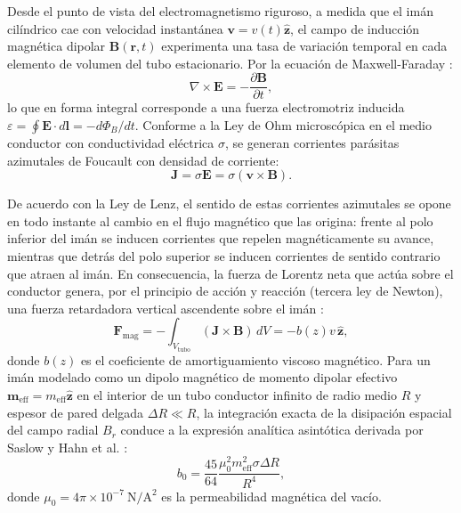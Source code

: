 \documentclass[aps,prb,reprint,twocolumn,superscriptaddress,amsmath,amssymb,floatfix]{revtex4-2}
\begin{document}
Desde el punto de vista del electromagnetismo riguroso, a medida que el imán cilíndrico cae con velocidad instantánea $\mathbf{v} = v(t)\hat{\mathbf{z}}$, el campo de inducción magnética dipolar $\mathbf{B}(\mathbf{r}, t)$ experimenta una tasa de variación temporal en cada elemento de volumen del tubo estacionario. Por la ecuación de Maxwell-Faraday \cite{Griffiths2017}:
\begin{equation}
\nabla \times \mathbf{E} = -\frac{\partial \mathbf{B}}{\partial t},
\label{eq:faraday}
\end{equation}
lo que en forma integral corresponde a una fuerza electromotriz inducida $\varepsilon = \oint \mathbf{E} \cdot d\mathbf{l} = -d\Phi_B / dt$. Conforme a la Ley de Ohm microscópica en el medio conductor con conductividad eléctrica $\sigma$, se generan corrientes parásitas azimutales de Foucault con densidad de corriente:
\begin{equation}
\mathbf{J} = \sigma \mathbf{E} = \sigma (\mathbf{v} \times \mathbf{B}).
\label{eq:ohm}
\end{equation}

De acuerdo con la Ley de Lenz, el sentido de estas corrientes azimutales se opone en todo instante al cambio en el flujo magnético que las origina: frente al polo inferior del imán se inducen corrientes que repelen magnéticamente su avance, mientras que detrás del polo superior se inducen corrientes de sentido contrario que atraen al imán. En consecuencia, la fuerza de Lorentz neta que actúa sobre el conductor genera, por el principio de acción y reacción (tercera ley de Newton), una fuerza retardadora vertical ascendente sobre el imán \cite{Hahn2002,MacLatchy1993}:
\begin{equation}
\mathbf{F}_{\mathrm{mag}} = -\int_{V_{\mathrm{tubo}}} (\mathbf{J} \times \mathbf{B})\, dV = -b(z) v\, \hat{\mathbf{z}},
\label{eq:fuerza_lorentz}
\end{equation}
donde $b(z)$ es el coeficiente de amortiguamiento viscoso magnético. Para un imán modelado como un dipolo magnético de momento dipolar efectivo $\mathbf{m}_{\mathrm{eff}} = m_{\mathrm{eff}}\hat{\mathbf{z}}$ en el interior de un tubo conductor infinito de radio medio $R$ y espesor de pared delgada $\Delta R \ll R$, la integración exacta de la disipación espacial del campo radial $B_r$ conduce a la expresión analítica asintótica derivada por Saslow \cite{Saslow1992} y Hahn et al. \cite{Hahn2002}:
\begin{equation}
b_0 = \frac{45}{64} \frac{\mu_0^2 m_{\mathrm{eff}}^2 \sigma \Delta R}{R^4},
\label{eq:b_analitico}
\end{equation}
donde $\mu_0 = 4\pi \times 10^{-7}\ \mathrm{N/A^2}$ es la permeabilidad magnética del vacío.
\end{document}
